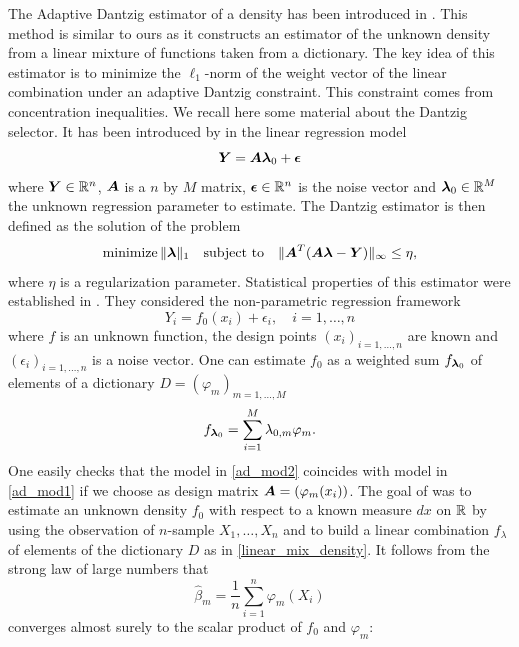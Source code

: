 The Adaptive Dantzig estimator of a density has been introduced in \citep{Bertin}. This method is similar to ours as it constructs an estimator of the unknown density from a linear mixture of functions taken from a dictionary. The key idea of this estimator is to minimize the $\ell_1$-norm of the weight vector of the linear combination under an adaptive Dantzig constraint. This constraint comes from concentration inequalities. We recall here some material about the Dantzig selector. It has been introduced by \citep{candes2007} in the linear regression model
\begin{equation}
\label{ad_mod1}
  \boldsymbol Y = \boldsymbol A \boldsymbol \lambda_0 + \boldsymbol \epsilon
\end{equation}
where $\boldsymbol Y\in {\mathbb R}^n$, $\boldsymbol A$ is a $n$ by $M$ matrix, $\boldsymbol \epsilon \in {\mathbb R}^n$ is the noise vector and $\boldsymbol \lambda_0 \in {\mathbb R}^M$ the unknown regression parameter to estimate. The Dantzig estimator is then defined as the solution of the problem
\begin{equation}
   \textnormal{minimize}\,  \|\boldsymbol \lambda \|_1 \quad \text{subject to} \quad \| \boldsymbol A^T(\boldsymbol A\boldsymbol \lambda-\boldsymbol Y)\|_{\infty} \leq \eta,
\end{equation}
where $\eta$ is a regularization parameter. Statistical properties of this estimator were established in \citep{bickel2009}. They considered the non-parametric regression framework
\begin{equation}
\label{ad_mod2}
    Y_i = f_0(x_i) + \epsilon_i, \quad i=1,\dots,n
\end{equation}
where $f$ is an unknown function, the design points $(x_i)_{i=1,\dots,n}$ are known and $(\epsilon_i)_{i=1,\dots,n}$ is a noise vector. One can estimate $f_0$ as a weighted sum $f_{\boldsymbol \lambda_0}$ of elements of a dictionary $D=(\varphi_m)_{m=1,\dots,M}$
\begin{equation}
\label{linear_mix_density}
  f_{\boldsymbol \lambda_0} = \sum_{i=1}^M\lambda_{0, m}\varphi_m.
\end{equation}
One easily checks that the model in \ref{ad_mod2} coincides with model in \cref{ad_mod1} if we choose as design matrix 
$\boldsymbol A = (\varphi_m(x_i))$. The goal of \citep{Bertin} was to estimate an unknown density $f_0$ with respect to a known 
measure $dx$ on ${\mathbb R}$ by using the observation of $n$-sample $X_1,\dots,X_n$ and to build a linear combination $f_{\lambda}$ 
of elements of the dictionary $D$ as in \cref{linear_mix_density}. It follows from the strong law of large numbers that 
$$
\hat\beta_m = \frac{1}{n}\sum_{i=1}^n\varphi_m(X_i)
$$ 
converges almost surely to the scalar product of $f_0$ and $\varphi_m$:
